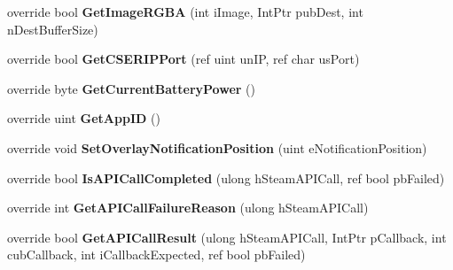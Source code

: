 \begin{DoxyCompactItemize}
\item 
\mbox{\label{class_valve_1_1_steamworks_1_1_c_steam_utils_adce3df0b5dea4617188d56caa9ffa8c1}} 
override bool {\bfseries Get\+Image\+R\+G\+BA} (int i\+Image, Int\+Ptr pub\+Dest, int n\+Dest\+Buffer\+Size)
\item 
\mbox{\label{class_valve_1_1_steamworks_1_1_c_steam_utils_a44f45a9cc7662e48c70fc897061d5a8f}} 
override bool {\bfseries Get\+C\+S\+E\+R\+I\+P\+Port} (ref uint un\+IP, ref char us\+Port)
\item 
\mbox{\label{class_valve_1_1_steamworks_1_1_c_steam_utils_aeae3a773b6c4b1cbf2f5b30b33ac9037}} 
override byte {\bfseries Get\+Current\+Battery\+Power} ()
\item 
\mbox{\label{class_valve_1_1_steamworks_1_1_c_steam_utils_aaaa36e17fe417f96bf6650cf056db7a2}} 
override uint {\bfseries Get\+App\+ID} ()
\item 
\mbox{\label{class_valve_1_1_steamworks_1_1_c_steam_utils_a1c8bb808f2719bacf47f8c97b1a102aa}} 
override void {\bfseries Set\+Overlay\+Notification\+Position} (uint e\+Notification\+Position)
\item 
\mbox{\label{class_valve_1_1_steamworks_1_1_c_steam_utils_ade701040d71504b573acb7a65477113d}} 
override bool {\bfseries Is\+A\+P\+I\+Call\+Completed} (ulong h\+Steam\+A\+P\+I\+Call, ref bool pb\+Failed)
\item 
\mbox{\label{class_valve_1_1_steamworks_1_1_c_steam_utils_a3e634d853aa9a13e37368a810eb46049}} 
override int {\bfseries Get\+A\+P\+I\+Call\+Failure\+Reason} (ulong h\+Steam\+A\+P\+I\+Call)
\item 
\mbox{\label{class_valve_1_1_steamworks_1_1_c_steam_utils_a5b8c4df144b159eedf3d05724301ef61}} 
override bool {\bfseries Get\+A\+P\+I\+Call\+Result} (ulong h\+Steam\+A\+P\+I\+Call, Int\+Ptr p\+Callback, int cub\+Callback, int i\+Callback\+Expected, ref bool pb\+Failed)

\end{DoxyCompactItemize}
